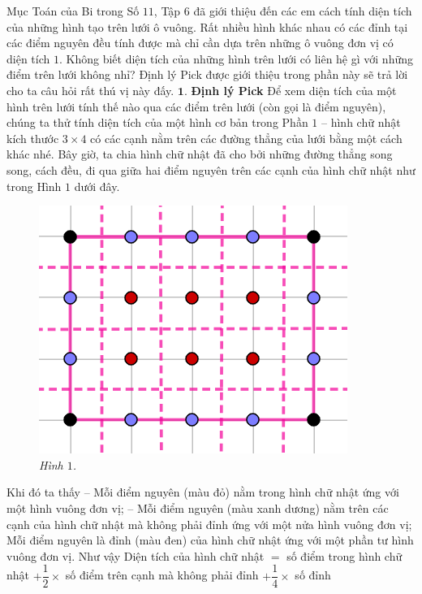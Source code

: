 \begin{multicols}{2}
	Mục Toán của Bi trong Số $11$, Tập $6$ đã giới thiệu đến các em cách tính diện tích của những hình tạo trên lưới ô vuông. Rất nhiều hình khác nhau có các đỉnh tại các điểm nguyên đều tính được mà chỉ cần dựa trên những ô vuông đơn vị có diện tích $1$. Không biết diện tích của những hình trên lưới có liên hệ gì với những điểm trên lưới không nhỉ? Định lý Pick được giới thiệu trong phần này sẽ trả lời cho ta câu hỏi rất thú vị này đấy.
	\vskip 0.1cm
	$\pmb{1.}$ \textbf{\color{toancuabi}Định lý Pick}
	\vskip 0.1cm
	Để xem diện tích của một hình trên lưới tính thế nào qua các điểm trên lưới (còn gọi là điểm nguyên), chúng ta thử tính diện tích của một hình cơ bản trong Phần $1$ -- hình chữ nhật kích thước $3\times4$ có các cạnh nằm trên các đường thẳng của lưới bằng một cách khác nhé. Bây giờ, ta chia hình chữ nhật đã cho bởi những đường thẳng song song, cách đều, đi qua giữa hai điểm nguyên trên các cạnh của hình chữ nhật như trong Hình $1$ dưới đây. 
	\begin{figure}[H]
		\vspace*{-5pt}
		\centering
		\captionsetup{labelformat= empty, justification=centering}
		\includegraphics[width= 0.65\linewidth]{1}
		\caption{\small\textit{\color{toancuabi}Hình $1$.}}
		\vspace*{-5pt}
	\end{figure}
	Khi đó ta thấy
	\vskip 0.1cm
	-- Mỗi điểm nguyên ({\color{red}màu đỏ}) nằm trong hình chữ nhật ứng với một hình vuông đơn vị;
	\vskip 0.1cm
	-- Mỗi điểm nguyên ({\color{blue}màu xanh dương}) nằm trên các cạnh của hình chữ nhật mà không phải đỉnh ứng với một nửa hình vuông đơn vị;
	\vskip 0.1cm
	Mỗi điểm nguyên là đỉnh ({\color{black}màu đen}) của hình chữ nhật ứng với một phần tư hình vuông đơn vị.
	\vskip 0.1cm
	Như vậy
	\vskip 0.1cm
	Diện tích của hình chữ nhật $=$ số điểm trong hình chữ nhật
	$+ \dfrac{1}{2}\times$ số điểm trên cạnh mà không phải đỉnh $+ \dfrac{1}{4}\times$ số đỉnh

\end{multicols}
